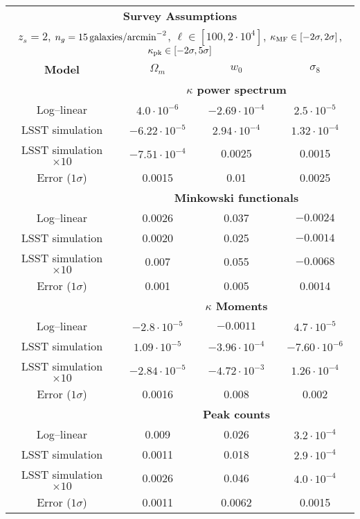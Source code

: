 \begin{table}
\begin{center}
\begin{tabular}{c|ccc} 
\multicolumn{4}{c}{\textbf{Survey Assumptions}} \\
\multicolumn{4}{c}{$z_s=2$, $n_g=15\,{\rm galaxies/arcmin}^{-2}$, $\ell\in[100,2\cdot10^4]$, $\kappa_{\rm MF}\in[-2\sigma,2\sigma]$, $\kappa_{\rm pk}\in[-2\sigma,5\sigma]$} \\ \hline \hline

\textbf{Model} & $\Omega_m$ & $w_0$ & $\sigma_8$  \\ \hline \hline 
&\multicolumn{3}{c}{\textbf{$\kappa$ power spectrum}} \\ 
Log--linear & $4.0\cdot 10^{-6}$  & $-2.69\cdot 10^{-4}$ & $2.5\cdot 10^{-5}$ \\
LSST simulation &  $-6.22\cdot10^{-5}$ &  $2.94\cdot10^{-4}$ &  $1.32\cdot10^{-4}$ \\
LSST simulation $\times 10$ & $-7.51\cdot10^{-4}$ &  0.0025 &  0.0015 \\ 
Error ($1\sigma$) & 0.0015 & 0.01 & 0.0025 \\ \hline \hline

&\multicolumn{3}{c}{\textbf{Minkowski functionals}} \\ 
Log--linear & 0.0026 &0.037 & $-0.0024$ \\
LSST simulation & 0.0020 &  0.025 & $-0.0014$ \\
LSST simulation $\times 10$ & 0.007 & 0.055 & $-0.0068$ \\ 
Error ($1\sigma$) & 0.001 &0.005  &0.0014 \\ \hline

&\multicolumn{3}{c}{\textbf{$\kappa$ Moments}} \\ 
Log--linear & $-2.8\cdot 10^{-5}$ & $-0.0011$  & $4.7\cdot 10^{-5}$ \\
LSST simulation & $1.09\cdot10^{-5}$ & $-3.96\cdot10^{-4}$ & $-7.60\cdot10^{-6}$ \\
LSST simulation $\times 10$ & $-2.84\cdot10^{-5}$ & $-4.72\cdot10^{-3}$ &  $1.26\cdot10^{-4}$ \\ 
Error ($1\sigma$) & 0.0016 &0.008  & 0.002  \\ \hline \hline

&\multicolumn{3}{c}{\textbf{Peak counts}} \\ 
Log--linear & 0.009 & 0.026 & $3.2\cdot 10^{-4}$ \\
LSST simulation & 0.0011 &  0.018 &  $2.9\cdot10^{-4}$ \\
LSST simulation $\times 10$ & 0.0026 & 0.046 & $4.0\cdot10^{-4}$ \\ 
Error ($1\sigma$) & 0.0011  & 0.0062  & 0.0015 \\ \hline \hline


\end{tabular}
\end{center}
\end{table}
